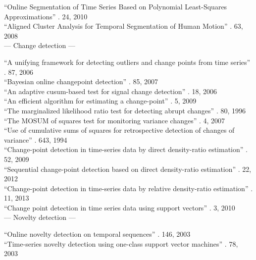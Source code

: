 ``Online Segmentation of Time Series Based on Polynomial Least-Squares Approximations'' \cite{fuchs2010online}. 24, 2010 \\

``Aligned Cluster Analysis for Temporal Segmentation of Human Motion'' \cite{zhou2008aligned}. 63, 2008 \\

--- Change detection ---

``A unifying framework for detecting outliers and change points from time series'' \cite{takeuchi2006unifying}. 87, 2006 \\

``Bayesian online changepoint detection'' \cite{adams2007bayesian}. 85, 2007 \\

``An adaptive cusum-based test for signal change detection'' \cite{alippi2006adaptive}. 18, 2006 \\

``An efficient algorithm for estimating a change-point'' \cite{cheng2009efficient}. 5, 2009 \\

``The marginalized likelihood ratio test for detecting abrupt changes'' \cite{gustafsson1996marginalized}. 80, 1996 \\

``The MOSUM of squares test for monitoring variance changes'' \cite{hsu2007mosum}. 4, 2007 \\

``Use of cumulative sums of squares for retrospective detection of changes of variance'' \cite{inclan1994use}. 643, 1994 \\

``Change-point detection in time-series data by direct density-ratio estimation'' \cite{kawahara2009change}. 52, 2009 \\
``Sequential change-point detection based on direct density-ratio estimation'' \cite{kawahara2012sequential}. 22, 2012 \\
``Change-point detection in time-series data by relative density-ratio estimation'' \cite{liu2013change}. 11, 2013 \\

``Change point detection in time series data using support vectors'' \cite{camci2010change}. 3, 2010 \\

--- Novelty detection ---

``Online novelty detection on temporal sequences'' \cite{ma2003online}. 146, 2003 \\
``Time-series novelty detection using one-class support vector machines'' \cite{ma2003time}. 78, 2003 \\

